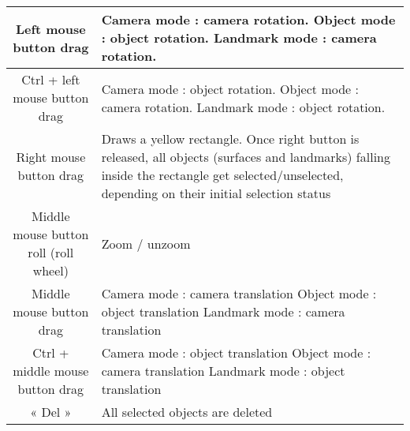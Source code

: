 \begin{tabularx}{\linewidth}{ | c | X | }
Left mouse button drag 
& Camera mode : camera rotation.\newline
 Object mode : object rotation.\newline
Landmark mode : camera rotation. \\ \hline			

Ctrl + left mouse button drag 
& Camera mode : object rotation.\newline
 Object mode : camera rotation.\newline
 Landmark mode : object rotation. \\ \hline	
		
Right mouse button drag & Draws a yellow rectangle. Once right button is
released, all objects (surfaces and landmarks)
falling inside the rectangle get selected/unselected,
depending on their initial selection status \\ \hline	
		

Middle mouse button roll (roll wheel) & Zoom / unzoom \\ \hline		
	
Middle mouse button drag 
& Camera mode : camera translation\newline
 Object mode : object translation\newline
 Landmark mode : camera translation \\ \hline	
		
Ctrl + middle mouse button drag 
& Camera mode : object translation\newline
Object mode : camera translation\newline
Landmark mode : object translation \\ \hline			

« Del » & All selected objects are deleted \\ \hline			



 \end{tabularx}

